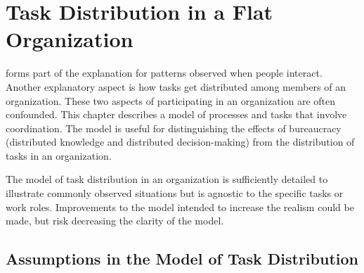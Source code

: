 \chapter{Task Distribution in a Flat Organization\label{sec:work-distribution}}

\iftoggle{glossarysubstitutionworks}{\Gls{bureaucracy}}{Bureaucracy}  
forms part of the explanation for patterns observed when people interact. Another explanatory aspect is how tasks get distributed among members of an organization. These two aspects of participating in an organization are often confounded. This chapter describes a model of processes and tasks that involve coordination. 
The model is useful for distinguishing the effects of bureaucracy (distributed knowledge and distributed decision-making) from the distribution of tasks in an organization.

The model of task distribution in an organization is sufficiently detailed to illustrate commonly observed situations but is agnostic to the specific tasks or work roles. Improvements to the model intended to increase the realism could be made, but risk decreasing the clarity of the model.

\section{Assumptions in the Model of Task Distribution}

